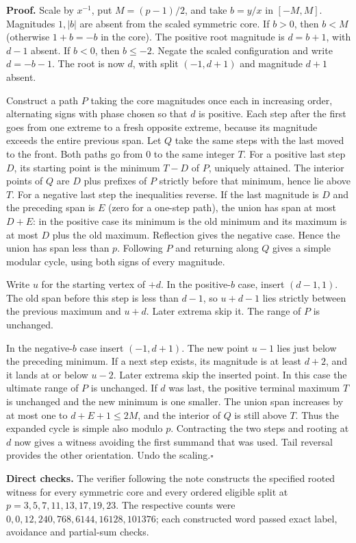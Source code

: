\documentclass[11pt]{article}
\begin{document}
\textbf{Proof.} Scale by $x^{-1}$, put $M=(p-1)/2$, and take $b=y/x$ in $[-M,M]$. Magnitudes $1,|b|$ are absent from the scaled symmetric core. If $b>0$, then $b<M$ (otherwise $1+b=-b$ in the core). The positive root magnitude is $d=b+1$, with $d-1$ absent. If $b<0$, then $b\le-2$. Negate the scaled configuration and write $d=-b-1$. The root is now $d$, with split $(-1,d+1)$ and magnitude $d+1$ absent.

Construct a path $P$ taking the core magnitudes once each in increasing order, alternating signs with phase chosen so that $d$ is positive. Each step after the first goes from one extreme to a fresh opposite extreme, because its magnitude exceeds the entire previous span. Let $Q$ take the same steps with the last moved to the front. Both paths go from $0$ to the same integer $T$. For a positive last step $D$, its starting point is the minimum $T-D$ of $P$, uniquely attained. The interior points of $Q$ are $D$ plus prefixes of $P$ strictly before that minimum, hence lie above $T$. For a negative last step the inequalities reverse. If the last magnitude is $D$ and the preceding span is $E$ (zero for a one-step path), the union has span at most $D+E$: in the positive case its minimum is the old minimum and its maximum is at most $D$ plus the old maximum. Reflection gives the negative case. Hence the union has span less than $p$. Following $P$ and returning along $Q$ gives a simple modular cycle, using both signs of every magnitude.

Write $u$ for the starting vertex of $+d$. In the positive-$b$ case, insert $(d-1,1)$. The old span before this step is less than $d-1$, so $u+d-1$ lies strictly between the previous maximum and $u+d$. Later extrema skip it. The range of $P$ is unchanged.

In the negative-$b$ case insert $(-1,d+1)$. The new point $u-1$ lies just below the preceding minimum. If a next step exists, its magnitude is at least $d+2$, and it lands at or below $u-2$. Later extrema skip the inserted point. In this case the ultimate range of $P$ is unchanged. If $d$ was last, the positive terminal maximum $T$ is unchanged and the new minimum is one smaller. The union span increases by at most one to $d+E+1\le 2M$, and the interior of $Q$ is still above $T$. Thus the expanded cycle is simple also modulo $p$. Contracting the two steps and rooting at $d$ now gives a witness avoiding the first summand that was used. Tail reversal provides the other orientation. Undo the scaling.\hfill$\square$

\textbf{Direct checks.} The verifier following the note constructs the specified rooted witness for every symmetric core and every ordered eligible split at $p=3,5,7,11,13,17,19,23$. The respective counts were $0,0,12,240,768,6144,16128,101376$; each constructed word passed exact label, avoidance and partial-sum checks.
\end{document}
